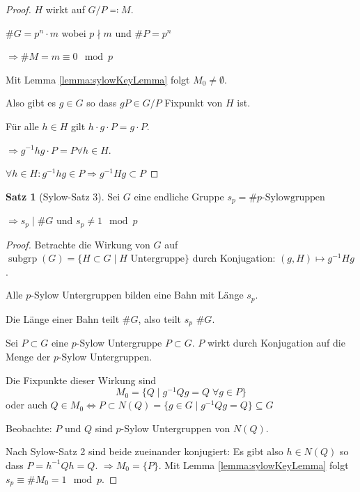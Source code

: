 \documentclass[12pt,parskip=full]{scrartcl}
\theoremstyle{definition}
\newtheorem{theorem}{Satz}[section]
\theoremstyle{remark}
\begin{document}
	\begin{proof}
		$H$ wirkt auf $G/P \eqqcolon M$.
		
		$\#G = p^n \cdot m$ wobei $p \nmid m$ und $\#P = p^n$
		
		$\Rightarrow \#M = m \equiv 0 \mod p$
		
		Mit Lemma \ref{lemma:sylowKeyLemma} folgt $M_0 \neq \emptyset$.
		
		Also gibt es $g \in G$ so dass $gP \in G/P$ Fixpunkt von $H$ ist.
		
		Für alle $h \in H$ gilt $h \cdot g \cdot P = g \cdot P$.
		
		$\Rightarrow g^{-1} h g \cdot P = P \forall h \in H$.
		
		$\forall h \in H: g^{-1} h g \in P \Rightarrow g^{-1} H g \subset P$
	\end{proof}

	\begin{theorem}[Sylow-Satz 3]
		Sei $G$ eine endliche Gruppe $s_p = \#\text{$p$-Sylowgruppen}$
		
		$\Rightarrow s_p \mid \#G$ und $s_p \neq 1 \mod p$
	\end{theorem}

	\begin{proof}
		Betrachte die Wirkung von $G$ auf $\operatorname{subgrp}(G) = \{ H \subset G \mid \text{$H$ Untergruppe} \}$ durch Konjugation: $(g, H) \mapsto g^{-1} H g$.
		
		Alle $p$-Sylow Untergruppen bilden eine Bahn mit Länge $s_p$.
		
		Die Länge einer Bahn teilt $\#G$, also teilt $s_p$ $\#G$.
		
		Sei $P \subset G$ eine $p$-Sylow Untergruppe $P \subset G$. $P$ wirkt durch Konjugation auf die Menge der $p$-Sylow Untergruppen.
		
		Die Fixpunkte dieser Wirkung sind
		\begin{equation*}
			M_0 = \{ Q \mid g^{-1} Q g = Q \; \forall g \in P \}
		\end{equation*}
		oder auch $Q \in M_0 \Leftrightarrow P \subset N(Q) = \{ g \in G \mid g^{-1} Q g = Q \} \subseteq G$
		
		Beobachte: $P$ und $Q$ sind $p$-Sylow Untergruppen von $N(Q)$.
		
		Nach Sylow-Satz 2 sind beide zueinander konjugiert: Es gibt also $h \in N(Q)$ so dass $P = h^{-1} Q h = Q$. $\Rightarrow M_0 = \{ P \}$. Mit Lemma \ref{lemma:sylowKeyLemma} folgt $s_p \equiv \# M_0 = 1 \mod p$.
	\end{proof}
\end{document}
